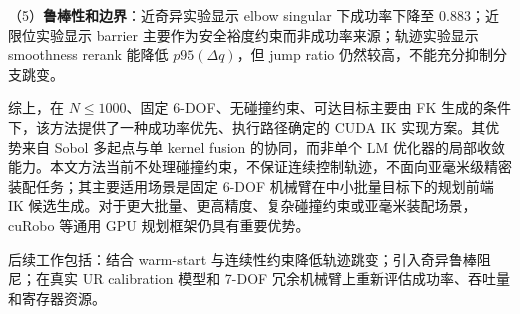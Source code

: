 \documentclass[twocolumn,a4paper,10pt]{ctexart}
\begin{document}
（5）\textbf{鲁棒性和边界}：近奇异实验显示 elbow singular 下成功率下降至 0.883；近限位实验显示 barrier 主要作为安全裕度约束而非成功率来源；轨迹实验显示 smoothness rerank 能降低 $p95(\Delta q)$，但 jump ratio 仍然较高，不能充分抑制分支跳变。

综上，在 $N\le1000$、固定 6-DOF、无碰撞约束、可达目标主要由 FK 生成的条件下，该方法提供了一种成功率优先、执行路径确定的 CUDA IK 实现方案。其优势来自 Sobol 多起点与单 kernel fusion 的协同，而非单个 LM 优化器的局部收敛能力。本文方法当前不处理碰撞约束，不保证连续控制轨迹，不面向亚毫米级精密装配任务；其主要适用场景是固定 6-DOF 机械臂在中小批量目标下的规划前端 IK 候选生成。对于更大批量、更高精度、复杂碰撞约束或亚毫米装配场景，cuRobo 等通用 GPU 规划框架仍具有重要优势。

后续工作包括：结合 warm-start 与连续性约束降低轨迹跳变；引入奇异鲁棒阻尼；在真实 UR calibration 模型和 7-DOF 冗余机械臂上重新评估成功率、吞吐量和寄存器资源。
\end{document}
